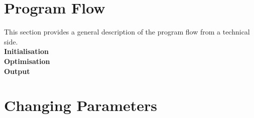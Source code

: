 \section*{Program Flow} 
  This section provides a general description of the program flow from a technical side. \\
  \textbf{Initialisation} \\

  \textbf{Optimisation} \\
  
  \textbf{Output} \\


\section*{Changing Parameters} 
